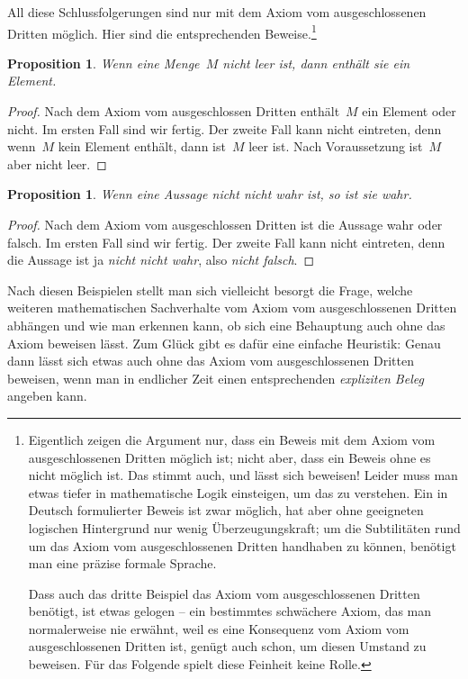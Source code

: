 \documentclass[twoside]{../zirkelblatt}
\theoremstyle{definition}
\theoremstyle{plain}
\newtheorem{prop}[defn]{Proposition}
\theoremstyle{remark}
\begin{document}
All diese Schlussfolgerungen sind nur mit dem Axiom vom ausgeschlossenen
Dritten möglich. Hier sind die entsprechenden Beweise.\footnote{Eigentlich
zeigen die Argument nur, dass ein Beweis mit dem
Axiom vom ausgeschlossenen Dritten möglich ist; nicht aber, dass ein Beweis
ohne es nicht möglich ist. Das stimmt auch, und lässt sich beweisen!
Leider muss man etwas tiefer in mathematische Logik einsteigen, um das zu
verstehen. Ein in Deutsch formulierter Beweis ist zwar möglich, hat aber ohne
geeigneten logischen Hintergrund nur wenig Überzeugungskraft; um die
Subtilitäten rund um das Axiom vom ausgeschlossenen Dritten handhaben zu
können, benötigt man eine präzise formale Sprache.

Dass auch das dritte Beispiel das Axiom vom ausgeschlossenen Dritten benötigt,
ist etwas gelogen -- ein bestimmtes schwächere Axiom, das man normalerweise nie
erwähnt, weil es eine Konsequenz vom Axiom vom ausgeschlossenen Dritten ist,
genügt auch schon, um diesen Umstand zu beweisen. Für das Folgende spielt diese
Feinheit keine Rolle.}
\begin{prop}Wenn eine Menge~$M$ nicht leer ist, dann enthält sie ein Element.
\end{prop}
\begin{proof}
Nach dem Axiom vom ausgeschlossen Dritten enthält~$M$ ein Element oder nicht.
Im ersten Fall sind wir fertig. Der zweite Fall kann nicht eintreten, denn
wenn~$M$ kein Element enthält, dann ist~$M$ leer ist. Nach Voraussetzung
ist~$M$ aber nicht leer.
\end{proof}

\begin{prop}Wenn eine Aussage \emph{nicht nicht} wahr ist, so ist sie wahr.
\end{prop}
\begin{proof}Nach dem Axiom vom ausgeschlossen Dritten ist die Aussage wahr
oder falsch. Im ersten Fall sind wir fertig. Der zweite Fall kann nicht
eintreten, denn die Aussage ist ja \emph{nicht nicht wahr}, also \emph{nicht
falsch}.
\end{proof}

Nach diesen Beispielen stellt man sich vielleicht besorgt die Frage, welche
weiteren mathematischen Sachverhalte vom Axiom vom ausgeschlossenen Dritten
abhängen und wie man erkennen kann, ob sich eine Behauptung auch ohne das Axiom
beweisen lässt. Zum Glück gibt es dafür eine einfache Heuristik: Genau dann
lässt sich etwas auch ohne das Axiom vom ausgeschlossenen Dritten beweisen,
wenn man in endlicher Zeit einen entsprechenden \emph{expliziten Beleg} angeben
kann.
\end{document}
